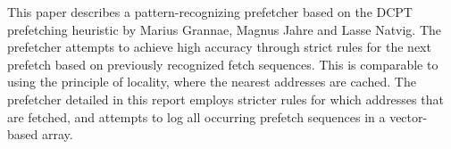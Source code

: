 This paper describes a pattern-recognizing prefetcher based on the DCPT prefetching heuristic by Marius Grannae, Magnus Jahre and Lasse Natvig. The prefetcher attempts to achieve high accuracy through strict rules for the next prefetch based on previously recognized fetch sequences. This is comparable to using the principle of locality, where the nearest addresses are cached. The prefetcher detailed in this report employs stricter rules for which addresses that are fetched, and attempts to log all occurring prefetch sequences in a vector-based array.